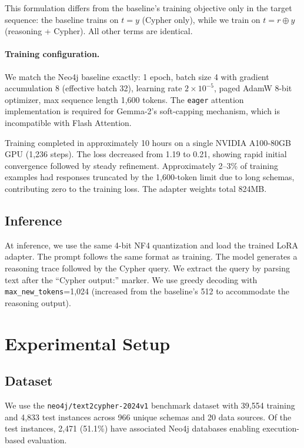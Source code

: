\documentclass[11pt]{article}
\begin{document}
This formulation differs from the baseline's training objective only in the target sequence: the baseline trains on $t = y$ (Cypher only), while we train on $t = r \oplus y$ (reasoning + Cypher). All other terms are identical.

\paragraph{Training configuration.} We match the Neo4j baseline exactly: 1 epoch, batch size 4 with gradient accumulation 8 (effective batch 32), learning rate $2 \times 10^{-5}$, paged AdamW 8-bit optimizer, max sequence length 1,600 tokens. The \texttt{eager} attention implementation is required for Gemma-2's soft-capping mechanism, which is incompatible with Flash Attention.

Training completed in approximately 10 hours on a single NVIDIA A100-80GB GPU (1,236 steps). The loss decreased from 1.19 to 0.21, showing rapid initial convergence followed by steady refinement. Approximately 2--3\% of training examples had responses truncated by the 1,600-token limit due to long schemas, contributing zero to the training loss. The adapter weights total 824MB.

\subsection{Inference}

At inference, we use the same 4-bit NF4 quantization and load the trained LoRA adapter. The prompt follows the same format as training. The model generates a reasoning trace followed by the Cypher query. We extract the query by parsing text after the ``Cypher output:'' marker. We use greedy decoding with \texttt{max\_new\_tokens}=1,024 (increased from the baseline's 512 to accommodate the reasoning output).

\section{Experimental Setup}

\subsection{Dataset}

We use the \texttt{neo4j/text2cypher-2024v1} benchmark dataset \citep{ozsoy2025text2cypher} with 39,554 training and 4,833 test instances across 966 unique schemas and 20 data sources. Of the test instances, 2,471 (51.1\%) have associated Neo4j databases enabling execution-based evaluation.
\end{document}
